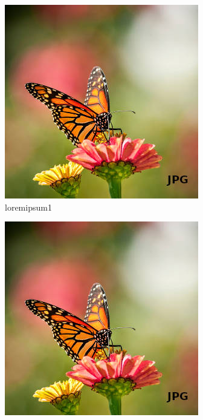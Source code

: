 \begin{figure}[h!]
\centering
    \captionsetup[subfigure]{justification=centering}
    \begin{subfigure}[b]{0.24\linewidth}
        \centering
        \includegraphics[width=\textwidth]{images/sample.jpeg}
        \caption{loremipsum1}
        \label{fig:loremipsum1}
    \end{subfigure}
    \begin{subfigure}[b]{0.24\linewidth}
        \centering
        \includegraphics[width=\textwidth]{images/sample.jpeg}

\end{subfigure}
\end{figure}
